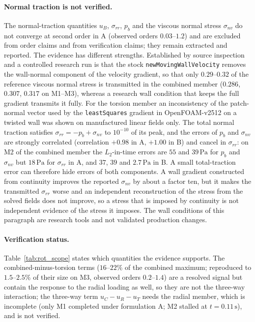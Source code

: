 \paragraph{Normal traction is not verified.}
The normal-traction quantities $u_B$, $\sigma_{rr}$, $p_b$ and the viscous normal stress $\sigma_{nv}$ do not converge at second order in A (observed orders $0.03$--$1.2$) and are excluded from order claims and from verification claims; they remain extracted and reported.
The evidence has different strengths.
Established by source inspection and a controlled research run is that the stock \texttt{newMovingWallVelocity} removes the wall-normal component of the velocity gradient, so that only $0.29$--$0.32$ of the reference viscous normal stress is transmitted in the combined member ($0.286$, $0.307$, $0.317$ on M1--M3), whereas a research wall condition that keeps the full gradient transmits it fully.
For the torsion member an inconsistency of the patch-normal vector used by the \texttt{leastSquares} gradient in OpenFOAM-v2512 on a twisted wall was shown on manufactured linear fields only.
The total normal traction satisfies $\sigma_{rr}=-p_b+\sigma_{nv}$ to $10^{-10}$ of its peak, and the errors of $p_b$ and $\sigma_{nv}$ are strongly correlated (correlation $+0.98$ in A, $+1.00$ in B) and cancel in $\sigma_{rr}$: on M2 of the combined member the $L_2$-in-time errors are $55$ and $39\,\mathrm{Pa}$ for $p_b$ and $\sigma_{nv}$ but $18\,\mathrm{Pa}$ for $\sigma_{rr}$ in A, and $37$, $39$ and $2.7\,\mathrm{Pa}$ in B.
A small total-traction error can therefore hide errors of both components.
A wall gradient constructed from continuity improves the reported $\sigma_{nv}$ by about a factor ten, but it makes the transmitted $\sigma_{rr}$ worse and an independent reconstruction of the stress from the solved fields does not improve, so a stress that is imposed by continuity is not independent evidence of the stress it imposes.
The wall conditions of this paragraph are research tools and not validated production changes.

\paragraph{Verification status.}
Table~\ref{tab:rot_scope} states which quantities the evidence supports.
The combined-minus-torsion terms ($16$--$22\%$ of the combined maximum; reproduced to $1.5$--$2.5\%$ of their size on M3, observed orders $0.2$--$1.4$) are a resolved signal but contain the response to the radial loading as well, so they are not the three-way interaction; the three-way term $u_C-u_R-u_T$ needs the radial member, which is incomplete (only M1 completed under formulation A; M2 stalled at $t=0.11\,\mathrm{s}$), and is not verified.

